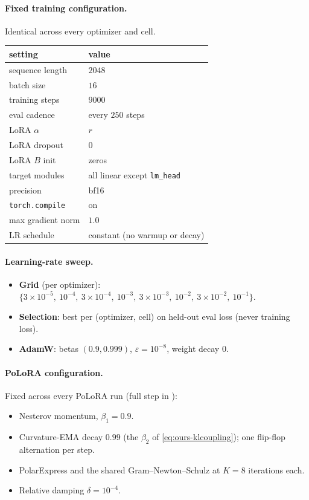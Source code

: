 \documentclass[11pt]{article}
\newcommand{\methodname}{PoLoRA\xspace}
\theoremstyle{plain}
\theoremstyle{definition}
\theoremstyle{remark}
\begin{document}
\paragraph{Fixed training configuration.} Identical across every optimizer and cell.
\begin{table}[h]
\centering\small
\begin{tabular}{@{}ll@{}}
\toprule
setting & value \\
\midrule
sequence length       & $2048$ \\
batch size             & $16$ \\
training steps         & $9000$ \\
eval cadence           & every $250$ steps \\
LoRA $\alpha$          & $r$ \\
LoRA dropout           & $0$ \\
LoRA $B$ init          & zeros \\
target modules         & all linear except \texttt{lm\_head} \\
precision              & bf16 \\
\texttt{torch.compile} & on \\
max gradient norm      & $1.0$ \\
LR schedule            & constant (no warmup or decay) \\
\bottomrule
\end{tabular}
\end{table}

\paragraph{Learning-rate sweep.}
\begin{itemize}[leftmargin=1.5em,itemsep=1pt,topsep=2pt]
  \item \textbf{Grid} (per optimizer): $\{3{\times}10^{-5},\ 10^{-4},\ 3{\times}10^{-4},\ 10^{-3},\ 3{\times}10^{-3},\ 10^{-2},\ 3{\times}10^{-2},\ 10^{-1}\}$.
  \item \textbf{Selection}: best per (optimizer, cell) on held-out eval loss (never training loss).
  \item \textbf{AdamW}: betas $(0.9,0.999)$, $\varepsilon{=}10^{-8}$, weight decay $0$.
\end{itemize}

\paragraph{\methodname{} configuration.} Fixed across every \methodname{} run (full step in ):
\begin{itemize}[leftmargin=1.5em,itemsep=1pt,topsep=2pt]
  \item Nesterov momentum, $\beta_1{=}0.9$.
  \item Curvature-EMA decay $0.99$ (the $\beta_2$ of \eqref{eq:ours-klcoupling}); one flip-flop alternation per step.
  \item PolarExpress and the shared Gram--Newton--Schulz at $K{=}8$ iterations each.
  \item Relative damping $\delta{=}10^{-4}$.
\end{itemize}
\end{document}
